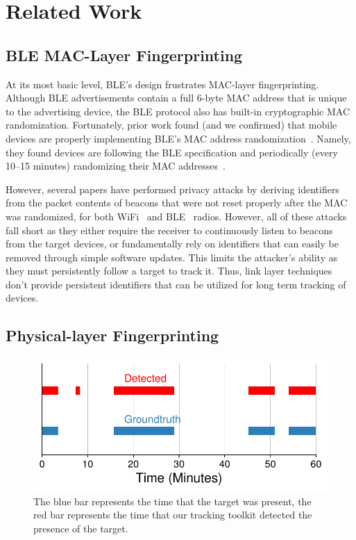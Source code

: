 \section{Related Work}
\label{sec:relatedwork}
\subsection*{BLE MAC-Layer Fingerprinting}
%
At its most basic level, BLE's design frustrates MAC-layer fingerprinting.
%
Although BLE advertisements contain a full 6-byte MAC address that is unique to the
advertising device, the BLE protocol also has built-in cryptographic MAC randomization.
%
Fortunately, prior work found (and we confirmed) that mobile devices are
properly implementing BLE's MAC address randomization~\cite{Iphonetracking_becker,MACRandomizationfail_Martin}.
%
Namely, they found devices are following the BLE specification and periodically
(every 10--15 minutes) randomizing their MAC addresses~\cite{bluetoothprivacy}.
%

However, several papers have performed privacy attacks by deriving identifiers from the packet contents of beacons that were not reset properly after the MAC was
randomized, for both WiFi~\cite{sn1,MACRandomizationfail_Martin} and BLE~\cite{ryanble,spill2007bluesniff,Iphonetracking_becker,HandoffMartin,celosia2020close} radios.
%
However, all of these attacks fall short as they either require the receiver to continuously listen to beacons from the target devices, or fundamentally rely on identifiers that can easily be removed through simple software updates.
%
This limits the attacker's ability as they must persistently follow a target to track it.
%
Thus, link layer techniques don't provide persistent identifiers that can be utilized for long term tracking of devices.

\vspace{0.5em}

\subsection*{Physical-layer Fingerprinting}

\begin{figure}[t!]
    \centering
    \includegraphics[width = 0.9\linewidth]{bletracking/plots/case_study_android2.pdf} 
    \caption{The blue bar represents the time that the target was present, the red bar represents the time that our tracking toolkit detected the presence of the target.}
    \label{fig:android}
\end{figure}

